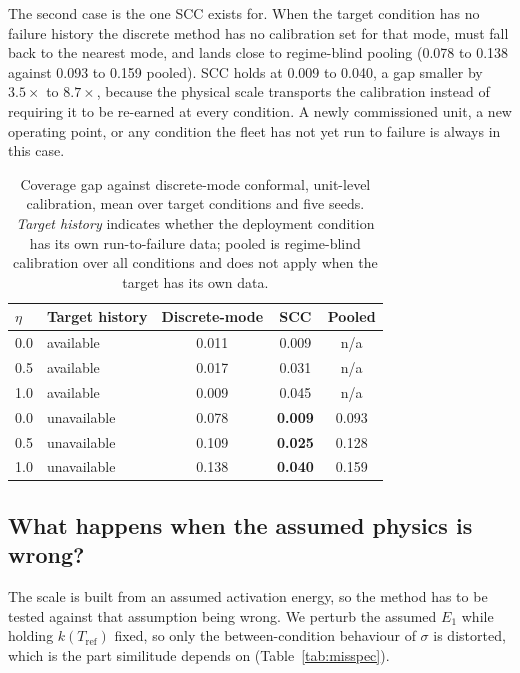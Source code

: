 \documentclass[review,times]{elsarticle}
\theoremstyle{definition}
\theoremstyle{remark}
\begin{document}
The second case is the one SCC exists for. When the target condition has no failure history the
discrete method has no calibration set for that mode, must fall back to the nearest mode, and lands
close to regime-blind pooling (0.078 to 0.138 against 0.093 to 0.159 pooled). SCC holds at 0.009 to
0.040, a gap smaller by $3.5\times$ to $8.7\times$, because the physical scale transports the
calibration instead of requiring it to be re-earned at every condition. A newly commissioned unit, a
new operating point, or any condition the fleet has not yet run to failure is always in this case.

\begin{table}[t]\centering\footnotesize
\setlength{\tabcolsep}{10pt}\renewcommand{\arraystretch}{1.2}
\caption{Coverage gap against discrete-mode conformal, unit-level calibration, mean over target
conditions and five seeds. \emph{Target history} indicates whether the deployment condition has its
own run-to-failure data; pooled is regime-blind calibration over all conditions and does not apply
when the target has its own data.}\label{tab:mondrian}
\begin{tabular}{@{}llccc@{}}\toprule
$\eta$ & Target history & Discrete-mode & SCC & Pooled \\\midrule
0.0 & available   & 0.011 & 0.009 & n/a \\
0.5 & available   & 0.017 & 0.031 & n/a \\
1.0 & available   & 0.009 & 0.045 & n/a \\\midrule
0.0 & unavailable & 0.078 & \textbf{0.009} & 0.093 \\
0.5 & unavailable & 0.109 & \textbf{0.025} & 0.128 \\
1.0 & unavailable & 0.138 & \textbf{0.040} & 0.159 \\\bottomrule
\end{tabular}
\end{table}

\subsection{What happens when the assumed physics is wrong?}\label{sec:res-misspec}
The scale is built from an assumed activation energy, so the method has to be tested against that
assumption being wrong. We perturb the assumed $E_1$ while holding $k(T_{\mathrm{ref}})$ fixed, so
only the between-condition behaviour of $\sigma$ is distorted, which is the part similitude depends
on (Table~\ref{tab:misspec}).
\end{document}
